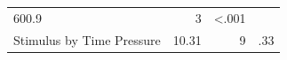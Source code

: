 \documentclass[11pt,]{article}
\begin{document}
\begin{longtable}[]{@{}lrrr@{}}
\begin{minipage}[t]{0.16\columnwidth}
600.9\strut
\end{minipage} & \begin{minipage}[t]{0.06\columnwidth}\raggedleft\strut
3\strut
\end{minipage} & \begin{minipage}[t]{0.06\columnwidth}\raggedleft\strut
\textless{}.001\strut
\end{minipage}\tabularnewline
\begin{minipage}[t]{0.32\columnwidth}\raggedright\strut
Stimulus by Time Pressure\strut
\end{minipage} & \begin{minipage}[t]{0.16\columnwidth}\raggedleft\strut
10.31\strut
\end{minipage} & \begin{minipage}[t]{0.06\columnwidth}\raggedleft\strut
9\strut
\end{minipage} & \begin{minipage}[t]{0.06\columnwidth}\raggedleft\strut
.33\strut
\end{minipage}\tabularnewline
\bottomrule
\end{longtable}
\end{document}
